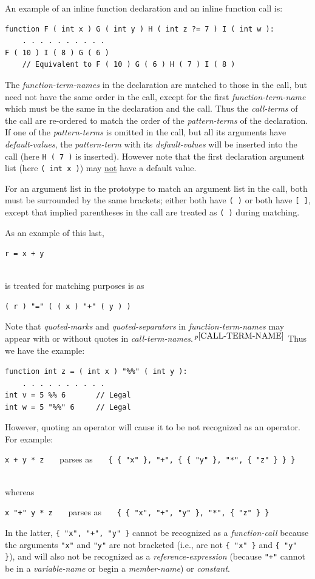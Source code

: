 \documentclass[12pt]{article}
\newcommand{\pagnote}[1]{$\,^{p\pageref{#1}}$}
\newenvironment{indpar}[1][0.3in]%
	{\begin{list}{}%
		     {\setlength{\itemsep}{0in}%
		      \setlength{\topsep}{0in}%
		      \setlength{\parsep}{1ex}%
		      \setlength{\labelwidth}{#1}%
		      \setlength{\leftmargin}{#1}%
		      \addtolength{\leftmargin}{\labelsep}}%
	 \item}%
	{\end{list}}
\begin{document}
An example of an inline function declaration and an inline function call is:
\begin{indpar}\begin{verbatim}
function F ( int x ) G ( int y ) H ( int z ?= 7 ) I ( int w ):
    . . . . . . . . . .
F ( 10 ) I ( 8 ) G ( 6 )
    // Equivalent to F ( 10 ) G ( 6 ) H ( 7 ) I ( 8 )
\end{verbatim}\end{indpar}

The {\em function-term-names} in the declaration are matched to those
in the call, but need not have the same order in the call, except for
the first {\em function-term-name} which must be the same in the
declaration and the call.  Thus the {\em call-terms} of the call
are re-ordered to match the order of the {\em pattern-terms} of the
declaration.  If one of the {\em pattern-terms} is omitted in the
call, but all its arguments have {\em default-values},
the {\em pattern-term} with its
{\em default-values} will be inserted into the call
(here {\tt H ( 7 )} is inserted).
However note that the first declaration argument list (here {\tt ( int x )})
may \underline{not} have a default value.

For an argument
list in the prototype to match an argument list in the call, both
must be surrounded by the same brackets; either both have {\tt (~)}
or both have {\tt [~]}, except that implied parentheses in the
call are treated as {\tt (~)} during matching.

As an example of this last,
\\[0.5ex]
\centerline{
{\tt r = x + y}
}
\\
is treated for matching purposes is as
\\[1ex]
\centerline{
{\tt ( r ) "=" ( ( x ) "+" ( y ) )}
}

Note that {\em quoted-marks} and {\em quoted-separators}
in {\em function-term-names} may appear with or without quotes in
{\em call-term-names}.\pagnote{CALL-TERM-NAME}  Thus we have the example:
\begin{indpar}\begin{verbatim}
function int z = ( int x ) "%%" ( int y ):
    . . . . . . . . . .
int v = 5 %% 6       // Legal
int w = 5 "%%" 6     // Legal
\end{verbatim}\end{indpar}

However, quoting an operator will cause it to be not recognized as
an operator.  For example:
\\[0.5ex]
\centerline{
{\tt x + y * z}
~~~parses as~~~
{\tt \{ \{ "x" \}, "+", \{ \{ "y" \}, "*", \{ "z" \} \} \}} \\
} \\
whereas \\
\centerline{
{\tt x "+" y * z}
~~~parses as~~~
{\tt \{ \{ "x", "+", "y" \}, "*", \{ "z" \} \}}
}
In the latter, {\tt \{ "x", "+", "y" \}} cannot be recognized as
a {\em function-call} because the arguments {\tt "x"} and {\tt "y"} are
not bracketed (i.e., are not {\tt \{ "x" \}} and {\tt \{ "y" \}}),
and will also not be recognized as a {\em reference-expression}
(because {\tt "+"} cannot be in a {\em variable-name} or
begin a {\em member-name}) or
{\em constant}.
\end{document}
